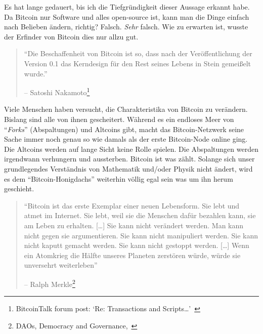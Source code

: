 Es hat lange gedauert, bis ich die Tiefgründigkeit dieser Aussage erkannt habe.
Da Bitcoin nur Software und alles open-source ist, kann man die Dinge einfach
nach Belieben ändern, richtig? Falsch. \textit{Sehr} falsch. Wie zu erwarten
ist, wusste der Erfinder von Bitcoin dies nur allzu gut.

\begin{quotation}\begin{samepage}
\enquote{Die Beschaffenheit von Bitcoin ist
so, dass nach der Veröffentlichung der Version 0.1 das Kerndesign für den Rest
seines Lebens in Stein gemeißelt wurde.} \begin{flushright} -- Satoshi
Nakamoto\footnote{BitcoinTalk forum post: `Re:
Transactions and Scripts\ldots'~\cite{satoshi-set-in-stone}}
\end{flushright}\end{samepage}\end{quotation}

Viele Menschen haben versucht, die Charakteristika von Bitcoin zu verändern.
Bislang sind alle von ihnen gescheitert. Während es ein endloses Meer von \enquote{\textit{Forks}}
(Abspaltungen) und Altcoins gibt, macht das Bitcoin-Netzwerk seine Sache immer
noch genau so wie damals als der erste Bitcoin-Node online ging. Die Altcoins
werden auf lange Sicht keine Rolle spielen. Die Abspaltungen werden irgendwann
verhungern und aussterben. Bitcoin ist was zählt. Solange sich unser
grundlegendes Verständnis von Mathematik und/oder Physik nicht ändert, wird es
dem “Bitcoin-Honigdachs” weiterhin völlig egal sein was um ihn herum geschieht.

\begin{quotation}\begin{samepage}
\enquote{Bitcoin ist das erste Exemplar einer neuen Lebensform. Sie lebt und
atmet im Internet. Sie lebt, weil sie die Menschen dafür bezahlen kann, sie am
Leben zu erhalten. [\ldots] Sie kann nicht verändert werden. Man kann nicht
gegen sie argumentieren. Sie kann nicht manipuliert werden. Sie kann nicht
kaputt gemacht werden. Sie kann nicht gestoppt werden. [\ldots] Wenn ein
Atomkrieg die Hälfte unseres Planeten zerstören würde, würde sie unversehrt
weiterleben}
\begin{flushright} -- Ralph Merkle\footnote{DAOs, Democracy and
Governance,~\cite{merkle-dao}}
\end{flushright}\end{samepage}\end{quotation}


